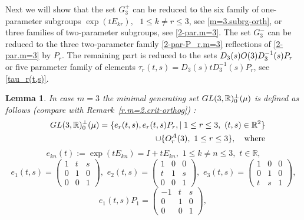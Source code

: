 \documentclass[preprint,12pt]{elsarticle}
\newtheorem{lem}[thm]{Lemma}
\numberwithin{equation}{section}
\begin{document}
%
Next we will show that the set $G_3^+$ can be reduced to  the 
six family of one-parameter subgroups $\exp(tE_{kr}),$ $\,\,1\leq k\not=r\leq 3$, see
\eqref{m=3.subrg-orth}, or three families of two-parameter subgroups, 
see \eqref{2-par.m=3}.
The set $G_3^-$  can be reduced to  the three two-parameter family  \eqref{2-par-P_r.m=3} 
reflections of \eqref{2-par.m=3}  by $P_r$. The remaining part is reduced to the sets $D_3(s){\rm O}(3)D^{-1}_3(s)P_r$
or five parameter family 
of elements $\tau_r(t,s)\!=\!D_3(s)tD^{-1}_3(s)P_r$, see \eqref{tau_r(t,s)}. 
%
% 
\begin{lem}
\label{l.m=3.crit-orthog} 
In case $m=3$ the {\rm minimal generating set} ${\rm GL}(3,{\mathbb R})^\perp_0(\mu)$ is defined as follows
(compare with Remark~\ref{r.m=2.crit-orthog}) :
%
\begin{eqnarray}
\nonumber 
&&
 {\rm GL}(3,{\mathbb R})^\perp_0(\mu)=\{e_r(t,s),e_r(t,s)P_r,\mid 1\leq r\leq 3,\,\,(t,s)\in {\mathbb R}^2\}\\
% 
\label{G_0-min-m=3} 
 &&
\cup\{
{\rm O}_r^A(3),\,\,1\leq r\leq 3\} ,\quad\text{where}
\end{eqnarray}
\begin{equation}
 \label{m=3.subrg-orth}
e_{kn}(t):=\exp(tE_{kn})=I+tE_{kn},\,\,1\leq k\not=n\leq 3,\,\,t\in \mathbb R,
\end{equation}
%
\begin{equation}
\label{2-par.m=3}
 e_1(t,s)=
 \left(\begin{smallmatrix}
 1&t&s\\
  0&1&0\\
  0&0&1
\end{smallmatrix}\right),\,\,
%
 e_2(t,s)= 
\left(\begin{smallmatrix}
1&0&0\\
t&1&s\\
0&0&1
\end{smallmatrix}\right),\,\,
%
 e_3(t,s)=   
 \left(\begin{smallmatrix}
1&0&0\\
  0&1&0\\
t&s&1
\end{smallmatrix}\right),
\end{equation}
%
\begin{equation}
\label{2-par-P_r.m=3}
 e_1(t,s)P_1\!=\!\left(\begin{smallmatrix}
 -1&t&s\\
  0&1&0\\
  0&0&1
\end{smallmatrix}\right),\,

\end{equation}
\end{lem}
\end{document}
